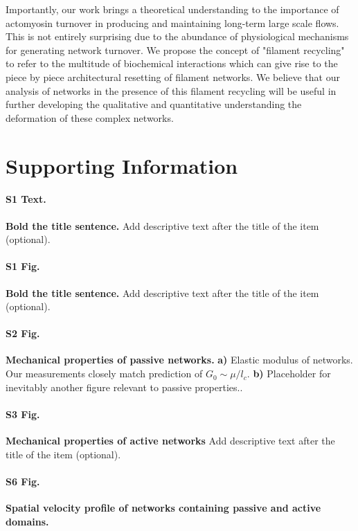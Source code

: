 \documentclass[10pt,letterpaper]{article}
\begin{document}
Importantly, our work brings a theoretical understanding to the importance of actomyosin turnover in producing and maintaining long-term large scale flows.  This is not entirely surprising due to the abundance of physiological mechanisms for generating network turnover.  We propose the concept of "filament recycling" to refer to the multitude of biochemical interactions which can give rise to the piece by piece architectural resetting of filament networks.  We believe that our analysis of networks in the presence of this filament recycling will be useful in further developing the qualitative and quantitative understanding the deformation of these complex networks.

\section*{Supporting Information}

\paragraph*{S1 Text.}
\label{S1_Text}
{\bf Bold the title sentence.} Add descriptive text after the title of the item (optional).

\paragraph*{S1 Fig.}
\label{S1_Fig}
{\bf Bold the title sentence.} Add descriptive text after the title of the item (optional).

\paragraph*{S2 Fig.}
\label{fig:passive_supp}
{\bf  Mechanical properties of passive networks.}  \textbf{a)} Elastic modulus of networks.  Our measurements closely match prediction of $G_0\sim\mu/l_c$.  \textbf{b)}  Placeholder for inevitably another figure relevant to passive properties..

\paragraph*{S3 Fig.}
\label{fig:active_supp}
{\bf Mechanical properties of active networks } Add descriptive text after the title of the item (optional).

\paragraph*{S6 Fig.}
\label{fig:combo_prof}
{\bf Spatial velocity profile of networks containing passive and active domains.} 
\end{document}

